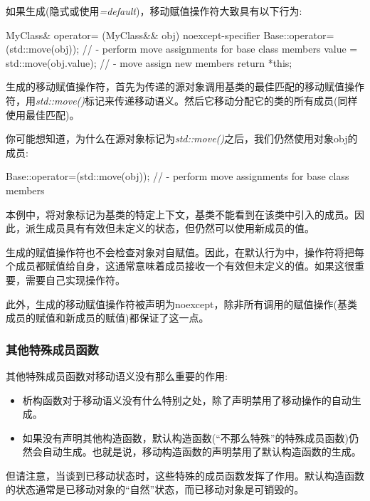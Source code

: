 如果生成(隐式或使用\textit{=default})，移动赋值操作符大致具有以下行为:

\begin{cppcode}
MyClass& operator= (MyClass&& obj) noexcept-specifier {
	Base::operator=(std::move(obj)); // - perform move assignments for base class members
	value = std::move(obj.value); // - move assign new members
	return *this;
}
\end{cppcode}

生成的移动赋值操作符，首先为传递的源对象调用基类的最佳匹配的移动赋值操作符，用\textit{std::move()}标记来传递移动语义。然后它移动分配它的类的所有成员(同样使用最佳匹配)。

你可能想知道，为什么在源对象标记为\textit{std::move()}之后，我们仍然使用对象obj的成员:

\begin{cppcode}
Base::operator=(std::move(obj)); // - perform move assignments for base class members
\end{cppcode}

本例中，将对象标记为基类的特定上下文，基类不能看到在该类中引入的成员。因此，派生成员具有有效但未定义的状态，但仍然可以使用新成员的值。

生成的赋值操作符也不会检查对象对自赋值。因此，在默认行为中，操作符将把每个成员都赋值给自身，这通常意味着成员接收一个有效但未定义的值。如果这很重要，需要自己实现操作符。

此外，生成的移动赋值操作符被声明为noexcept，除非所有调用的赋值操作(基类成员的赋值和新成员的赋值)都保证了这一点。

\subsubsection{其他特殊成员函数}

其他特殊成员函数对移动语义没有那么重要的作用:

\begin{itemize}
	\item 析构函数对于移动语义没有什么特别之处，除了声明禁用了移动操作的自动生成。
	\item 如果没有声明其他构造函数，默认构造函数(“不那么特殊”的特殊成员函数)仍然会自动生成。也就是说，移动构造函数的声明禁用了默认构造函数的生成。
\end{itemize}

但请注意，当谈到已移动状态时，这些特殊的成员函数发挥了作用。默认构造函数的状态通常是已移动对象的“自然”状态，而已移动对象是可销毁的。
















